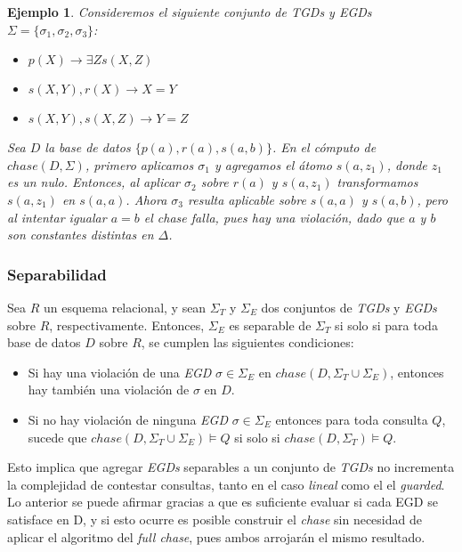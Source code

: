 \documentclass[11pt,a4paper,twoside]{tesis}
\newtheorem{exmp}{Ejemplo}
\begin{document}
\begin{exmp}
Consideremos el siguiente conjunto de TGDs y EGDs $\Sigma = \{\sigma_1, \sigma_2, \sigma_3\}$:

\begin{itemize}
    \item [$\sigma_1:$] $p(X) \rightarrow \exists Z s(X, Z)$
    \item [$\sigma_2:$] $s(X, Y), r(X)  \rightarrow X = Y$
    \item [$\sigma_3:$] $s(X, Y), s(X, Z) \rightarrow Y = Z$
\end{itemize}

Sea $D$ la base de datos $\{p(a), r(a), s(a, b)\}$. En el cómputo de $chase(D, \Sigma)$, primero aplicamos $\sigma_1$ y agregamos el átomo $s(a, z_1)$, donde $z_1$ es un nulo. Entonces, al aplicar $\sigma_2$ sobre $r(a)$ y $s(a, z_1)$ transformamos $s(a, z_1)$ en $s(a, a)$. Ahora $\sigma_3$ resulta aplicable sobre $s(a, a)$ y $s(a, b)$, pero al intentar igualar $a = b$ el \textit{chase} falla, pues hay una violación, dado que $a$ y $b$ son constantes distintas en $\Delta$.
\end{exmp}

\subsubsection{Separabilidad}
Sea $R$ un esquema relacional, y sean $\Sigma_T$ y $\Sigma_E$ dos conjuntos de \textit{TGDs} y \textit{EGDs} sobre $R$, respectivamente. Entonces, $\Sigma_E$ es separable de $\Sigma_T$ si solo si para toda base de datos $D$ sobre $R$, se cumplen las siguientes condiciones: 
\begin{itemize}
    \item  Si hay una violación de una \textit{EGD} $\sigma \in \Sigma_E$ en $chase(D, \Sigma_T \cup \Sigma_E)$, entonces hay también una violación de $\sigma$ en $D$.
    \item Si no hay violación de ninguna \textit{EGD} $\sigma \in \Sigma_E$ entonces para toda consulta $Q$, sucede que $chase(D, \Sigma_T \cup \Sigma_E) \models Q$ si solo si $chase(D, \Sigma_T) \models Q$.
\end{itemize}

Esto implica que agregar \textit{EGDs} separables a un conjunto de \textit{TGDs} no incrementa la complejidad de contestar consultas, tanto en el caso \textit{lineal} como el el \textit{guarded}. Lo anterior se puede afirmar gracias a que es suficiente evaluar si cada EGD se satisface en D, y si esto ocurre es posible construir el \textit{chase} sin necesidad de aplicar el algoritmo del \textit{full chase}, pues ambos arrojarán el mismo resultado.
\end{document}
